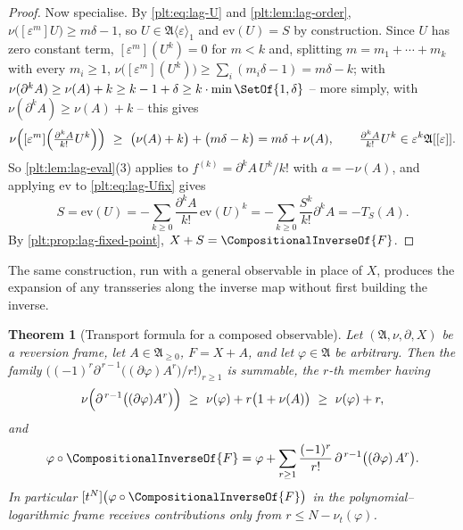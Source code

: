 \documentclass[11pt,oneside]{article}
\theoremstyle{plain}
\newtheorem{theorem}{Theorem}[section]
\theoremstyle{definition}
\theoremstyle{remark}
\newcommand{\ordt}{\nu_{t}}                              %
\newcommand{\compose}{\mathbin{\circ}}
\newcommand{\rev}[1]{\CompositionalInverseOf{#1}}
\begin{document}
\begin{proof}
Now specialise.  By \cref{plt:eq:lag-U} and \cref{plt:lem:lag-order},
\(\nu\bigl([\varepsilon^m]U\bigr)\ge m\delta-1\), so
\(U\in\mathfrak A\langle\varepsilon\rangle_1\) and
\(\mathrm{ev}(U)=S\) by construction.  Since \(U\) has zero constant term,
\([\varepsilon^m](U^k)=0\) for \(m<k\) and, splitting \(m=m_1+\cdots+m_k\) with
every \(m_i\ge1\),
\(\nu\bigl([\varepsilon^m](U^k)\bigr)\ge\sum_i(m_i\delta-1)=m\delta-k\); with
\(\nu(\partial^kA)\ge\nu(A)+k\ge k-1+\delta\ge k\cdot\min\SetOf{1,\delta}\) --
more simply, with \(\nu(\partial^kA)\ge\nu(A)+k\) -- this gives
\[
  \nu\Bigl([\varepsilon^m]\Bigl(\tfrac{\partial^kA}{k!}U^k\Bigr)\Bigr)
  \ \ge\ \bigl(\nu(A)+k\bigr)+\bigl(m\delta-k\bigr)=m\delta+\nu(A),
  \qquad
  \tfrac{\partial^kA}{k!}U^k\in\varepsilon^k\mathfrak A[[\varepsilon]] .
\]
So \cref{plt:lem:lag-eval}(3) applies to \(f^{(k)}=\partial^kA\,U^k/k!\) with
\(a=-\nu(A)\), and applying \(\mathrm{ev}\) to \cref{plt:eq:lag-Ufix} gives
\[
  S=\mathrm{ev}(U)=-\sum_{k\ge0}\frac{\partial^kA}{k!}\,\mathrm{ev}(U)^k
   =-\sum_{k\ge0}\frac{S^k}{k!}\partial^kA=-T_S(A).
\]
By \cref{plt:prop:lag-fixed-point}, \(X+S=\rev{F}\).
\end{proof}

The same construction, run with a general observable in place of \(X\),
produces the expansion of any transseries along the inverse map without first
building the inverse.

\begin{theorem}[Transport formula for a composed observable]
\label{plt:thm:lag-transport}
Let \((\mathfrak A,\nu,\partial,X)\) be a reversion frame, let
\(A\in\mathfrak A_{\ge0}\), \(F=X+A\), and let \(\varphi\in\mathfrak A\) be
arbitrary.  Then the family
\(\bigl((-1)^r\partial^{\,r-1}\bigl((\partial\varphi)A^r\bigr)/r!\bigr)_{r\ge1}\)
is summable, the \(r\)-th member having
\begin{equation}
\label{plt:eq:lag-transport-order}
  \nu\Bigl(\partial^{\,r-1}\bigl((\partial\varphi)A^r\bigr)\Bigr)
  \ \ge\ \nu(\varphi)+r\bigl(1+\nu(A)\bigr)\ \ge\ \nu(\varphi)+r,
\end{equation}
and
\begin{equation}
\label{plt:eq:lag-transport}
  \varphi\compose\rev{F}
  =\varphi+\sum_{r\ge1}\frac{(-1)^r}{r!}\,
      \partial^{\,r-1}\bigl((\partial\varphi)\,A^r\bigr).
\end{equation}
In particular \([t^N]\bigl(\varphi\compose\rev{F}\bigr)\) in the
polynomial--logarithmic frame receives contributions only from
\(r\le N-\ordt(\varphi)\).
\end{theorem}
\end{document}
